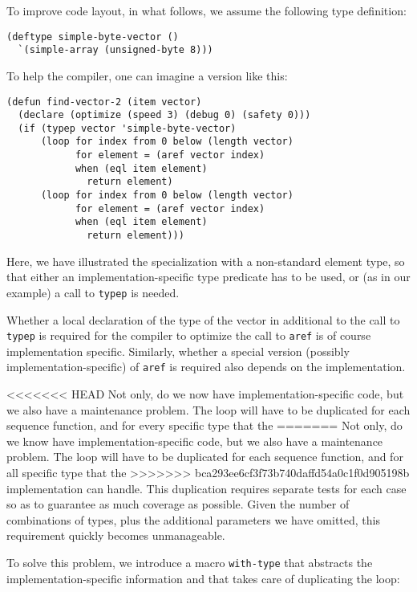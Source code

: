 To improve code layout, in what follows, we assume the following type
definition:

{\small\begin{verbatim}
(deftype simple-byte-vector ()
  `(simple-array (unsigned-byte 8)))
\end{verbatim}}

To help the compiler, one can imagine a version like this:

{\small\begin{verbatim}
(defun find-vector-2 (item vector)
  (declare (optimize (speed 3) (debug 0) (safety 0)))
  (if (typep vector 'simple-byte-vector)
      (loop for index from 0 below (length vector)
            for element = (aref vector index)
            when (eql item element)
              return element)
      (loop for index from 0 below (length vector)
            for element = (aref vector index)
            when (eql item element)
              return element)))
\end{verbatim}}

Here, we have illustrated the specialization with a non-standard
element type, so that either an implementation-specific type predicate
has to be used, or (as in our example) a call to \texttt{typep} is
needed.

Whether a local declaration of the type of the vector in additional to
the call to \texttt{typep} is required for the compiler to optimize
the call to \texttt{aref} is of course implementation specific.
Similarly, whether a special version (possibly
implementation-specific) of \texttt{aref} is required also depends on
the implementation.

<<<<<<< HEAD
Not only, do we now have implementation-specific code, but we also
have a maintenance problem.  The loop will have to be duplicated for
each sequence function, and for every specific type that the
=======
Not only, do we know have implementation-specific code, but we also
have a maintenance problem.  The loop will have to be duplicated for
each sequence function, and for all specific type that the
>>>>>>> bca293ee6cf3f73b740daffd54a0c1f0d905198b
implementation can handle.  This duplication requires separate tests
for each case so as to guarantee as much coverage as possible.  Given
the number of combinations of types, plus the additional parameters we
have omitted, this requirement quickly becomes unmanageable.

To solve this problem, we introduce a macro \texttt{with-type} that
abstracts the implementation-specific information and that takes care
of duplicating the loop:

